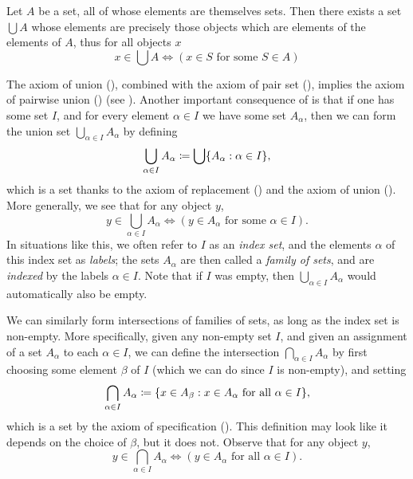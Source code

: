 \begin{ax}[Union]\label{i:3.11}
  Let \(A\) be a set, all of whose elements are themselves sets.
  Then there exists a set \(\bigcup A\) whose elements are precisely those objects which are elements of the elements of \(A\), thus for all objects \(x\)
  \[
    x \in \bigcup A \iff (x \in S \text{ for some } S \in A)
  \]
\end{ax}

\begin{note}
  The axiom of union (), combined with the axiom of pair set (), implies the axiom of pairwise union () (see ).
  Another important consequence of  is that if one has some set \(I\), and for every element \(\alpha \in I\) we have some set \(A_\alpha\), then we can form the union set \(\bigcup_{\alpha \in I} A_\alpha\) by defining
  \[
    \bigcup_{\alpha \in I} A_\alpha \coloneqq \bigcup \set{A_\alpha : \alpha \in I},
  \]
  which is a set thanks to the axiom of replacement () and the axiom of union ().
  More generally, we see that for any object \(y\),
  \[
    y \in \bigcup_{\alpha \in I} A_\alpha \iff (y \in A_\alpha \text{ for some } \alpha \in I).
  \]
  In situations like this, we often refer to \(I\) as an \emph{index set}, and the elements \(\alpha\) of this index set as \emph{labels};
  the sets \(A_\alpha\) are then called a \emph{family of sets}, and are \emph{indexed} by the labels \(\alpha \in I\).
  Note that if \(I\) was empty, then \(\bigcup_{\alpha \in I} A_\alpha\) would automatically also be empty.
\end{note}

\begin{note}
  We can similarly form intersections of families of sets, as long as the index set is non-empty.
  More specifically, given any non-empty set \(I\), and given an assignment of a set \(A_\alpha\) to each \(\alpha \in I\), we can define the intersection \(\bigcap_{\alpha \in I} A_\alpha\) by first choosing some element \(\beta\) of \(I\) (which we can do since \(I\) is non-empty), and setting
  \[
    \bigcap_{\alpha \in I} A_\alpha \coloneqq \set{x \in A_\beta : x \in A_\alpha \text{ for all } \alpha \in I},
  \]
  which is a set by the axiom of specification ().
  This definition may look like it depends on the choice of \(\beta\), but it does not.
  Observe that for any object \(y\),
  \[
    y \in \bigcap_{\alpha \in I} A_\alpha \iff (y \in A_\alpha \text{ for all } \alpha \in I).
  \]
\end{note}

